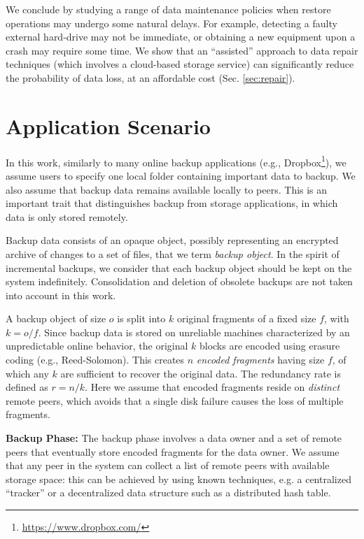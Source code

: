 \documentclass[conference,10pt]{IEEEtran}
\begin{document}
We conclude by studying a range of data maintenance policies when
restore operations may undergo some natural delays. For example,
detecting a faulty external hard-drive may not be immediate, or
obtaining a new equipment upon a crash may require some time. We show
that an ``assisted'' approach to data repair techniques (which
involves a cloud-based storage service) can significantly reduce the
probability of data loss, at an affordable cost (Sec. \ref{sec:repair}).

\section{Application Scenario}
\label{sec:background}

In this work, similarly to many online backup applications (e.g.,
Dropbox\footnote{\url{https://www.dropbox.com/}}), we assume users to
specify one local folder containing important data to backup. We also
assume that backup data remains available locally to peers. This is an
important trait that distinguishes backup from storage applications,
in which data is only stored remotely.

Backup data consists of an opaque object, possibly representing an
encrypted archive of changes to a set of files, that we
term \emph{backup object}. In the spirit of incremental backups, we
consider that each backup object should be kept on the system
indefinitely. Consolidation and deletion of obsolete backups are not
taken into account in this work.

A backup object of size $o$ is split into $k$ original fragments of a
fixed size $f$, with $k=o / f$. Since backup data is stored on
unreliable machines characterized by an unpredictable online behavior,
the original $k$ blocks are encoded using erasure coding (e.g.,
Reed-Solomon). This creates $n$ \emph{encoded fragments} having size
$f$, of which any $k$ are sufficient to recover the original data. The
redundancy rate is defined as $r=n / k$. Here we assume that encoded
fragments reside on \emph{distinct} remote peers, which avoids that a
single disk failure causes the loss of multiple fragments.

\noindent \textbf{Backup Phase:} The backup phase involves a data
owner and a set of remote peers that eventually store encoded
fragments for the data owner. We assume that any peer in the system
can collect a list of remote peers with available storage space: this
can be achieved by using known techniques, e.g. a centralized
``tracker'' or a decentralized data structure such as a distributed
hash table.
\end{document}
